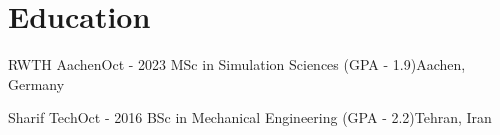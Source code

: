 \section{Education}
    \resumeSubHeadingListStart

    \resumeSubheading
    {RWTH Aachen}{Oct - 2023}
    {MSc in Simulation Sciences (GPA - 1.9)}{Aachen, Germany}
    \resumeItemListStart
    \resumeItemListEnd

    \resumeSubheading
    {Sharif Tech}{Oct - 2016}
    {BSc in Mechanical Engineering (GPA - 2.2)}{Tehran, Iran}
    \resumeItemListStart
    \resumeItemListEnd


    \resumeSubHeadingListEnd